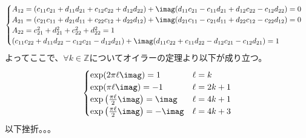 \documentclass[dvipdfmx,titlepage, 11pt, a4paper]{jsarticle}%
\begin{document}
\begin{itemize}
\begin{align*}
\begin{cases}
            A_{12} = (c_{11}c_{21} + d_{11}d_{21} + c_{12}c_{22} + d_{12}d_{22}) + \imag (d_{11}c_{21} -  c_{11}d_{21} + d_{12}c_{22} - c_{12}d_{22}) = 0\\
            A_{21} = (c_{21}c_{11} + d_{21}d_{11} + c_{22}c_{12} + d_{22}d_{12}) + \imag(d_{21}c_{11} - c_{21}d_{11} + d_{22}c_{12} - c_{22}d_{12}) = 0\\
            A_{22} = c_{21}^{2} + d_{21}^{2} + c_{22}^{2} + d_{22}^{2} = 1\\
            (c_{11}c_{22} + d_{11}d_{22} - c_{12}c_{21} - d_{12}d_{21}) + \imag (d_{11}c_{22} + c_{11}d_{22} - d_{12}c_{21} - c_{12}d_{21}) = 1
        \end{cases}
    \end{align*}
    よってここで、$\forall k \in \mathbb{Z}$についてオイラーの定理より以下が成り立つ。
    \begin{align*}
        \begin{cases}
            \exp(2\pi\ell\imag) = 1 & \ell = k\\
            \exp(\pi\ell\imag) = -1 & \ell = 2k + 1\\
            \exp\left(\frac{\pi\ell}{2}\imag\right)  = \imag & \ell = 4k + 1\\
            \exp\left(\frac{\pi\ell}{2}\imag\right)  = -\imag & \ell = 4k + 3\\
        \end{cases}
    \end{align*}
    以下挫折。。。
\end{itemize}
\end{document}
